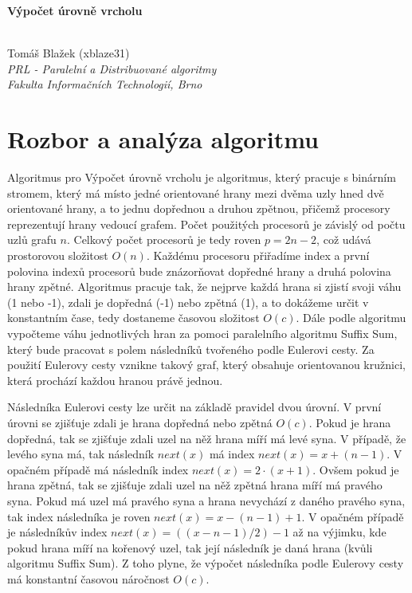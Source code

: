 \documentclass[12pt, a4paper]{article}
\begin{document}
\begin{center}
	\begin{huge}\textbf{Výpočet úrovně vrcholu}\end{huge} \\
	\vspace{0.4cm}
	Tomáš Blažek (xblaze31) \\
	\textit{PRL - Paralelní a Distribuované algoritmy} \\
	\textit{Fakulta Informačních Technologií, Brno} \\
\end{center}
 

\section{Rozbor a analýza algoritmu}
\label{sec:rozbor}
Algoritmus pro Výpočet úrovně vrcholu je algoritmus, který pracuje s binárním stromem, který má místo jedné orientované hrany mezi dvěma uzly hned dvě orientované hrany, a to jednu dopřednou a druhou zpětnou, přičemž procesory reprezentují hrany vedoucí grafem. Počet použitých procesorů je závislý od počtu uzlů grafu $n$. Celkový počet procesorů je tedy roven $p = 2n-2$, což udává prostorovou složitost $O(n)$. Každému procesoru přiřadíme index a první polovina indexů procesorů bude znázorňovat dopředné hrany a druhá polovina hrany zpětné. Algoritmus pracuje tak, že nejprve každá hrana si zjistí svoji váhu (1 nebo -1), zdali je dopředná (-1) nebo zpětná (1), a to dokážeme určit v konstantním čase, tedy dostaneme časovou složitost $O(c)$. Dále podle algoritmu vypočteme váhu jednotlivých hran za pomoci paralelního algoritmu Suffix Sum, který bude pracovat s polem následníků tvořeného podle Eulerovi cesty. Za použití Eulerovy cesty vznikne takový graf, který obsahuje orientovanou kružnici, která prochází každou hranou právě jednou.

Následníka Eulerovi cesty lze určit na základě pravidel dvou úrovní. V první úrovni se zjišťuje zdali je hrana dopředná nebo zpětná  $O(c)$. Pokud je hrana dopředná, tak se zjišťuje zdali uzel na něž hrana míří má levé syna. V případě, že levého syna má, tak následník $next(x)$ má index $next(x)=x+(n-1)$. V opačném případě má následník index $next(x)=2\cdot(x+1)$. Ovšem pokud je hrana zpětná, tak se zjišťuje zdali uzel na něž zpětná hrana míří má pravého syna. Pokud má uzel má pravého syna a hrana nevychází z daného pravého syna, tak index následníka je roven $next(x)=x-(n-1)+1$. V opačném případě je následníkův index $next(x)=((x-n-1)/2)-1$ až na výjimku, kde pokud hrana míří na kořenový uzel, tak její následník je daná hrana (kvůli algoritmu Suffix Sum). Z toho plyne, že výpočet následníka podle Eulerovy cesty má konstantní časovou náročnost $O(c)$.
\end{document}
